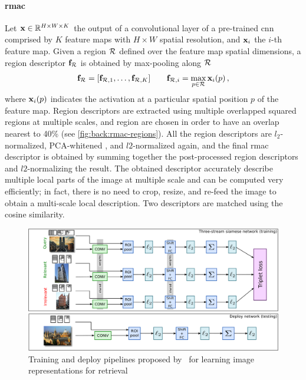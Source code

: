 \paragraph{\acrlong{rmac}}
Let $\mathbf{x} \in \mathbb{R}^{H \times W \times K}$ the output of a convolutional layer of a pre-trained \gls{cnn} comprised by $K$ feature maps with $H \times W$ spatial resolution, and $\mathbf{x}_i$ the $i$-th feature map.
Given a region $\mathcal{R}$ defined over the feature map spatial dimensions, a region descriptor $\mathbf{f}_{\mathcal{R}}$ is obtained by max-pooling along $\mathcal{R}$
\begin{equation} \label{eq:back:rmac-region}
\mathbf{f}_{\mathcal{R}} = [\mathbf{f}_{\mathcal{R},1}, \ldots, \mathbf{f}_{\mathcal{R},K}] \qquad \mathbf{f}_{\mathcal{R},i} = \max_{p \in \mathcal{R}} \mathbf{x}_i(p) \,,
\end{equation}
where $\mathbf{x}_i(p)$ indicates the activation at a particular spatial position $p$ of the feature map.
Region descriptors are extracted using multiple overlapped squared regions at multiple scales, and region are chosen in order to have an overlap nearest to 40\% (see \ref{fig:back:rmac-regions}).
All the region descriptors are $l_2$-normalized, PCA-whitened%
, and $l2$-normalized again, and the final \gls{rmac} descriptor is obtained by summing together the post-processed region descriptors and $l2$-normalizing the result.
The obtained descriptor accurately describe multiple local parts of the image at multiple scale and can be computed very efficiently;
in fact, there is no need to crop, resize, and re-feed the image to obtain a multi-scale local description.
Two descriptors are matched using the cosine similarity.

\begin{figure}
    \centering
    \includegraphics[width=\linewidth]{rmac-trained}
    \caption{Training and deploy pipelines proposed by~\citet{gordo2016deep,gordo2017end} for learning image representations for retrieval }
    \label{fig:back:rmac-trained}
\end{figure}

